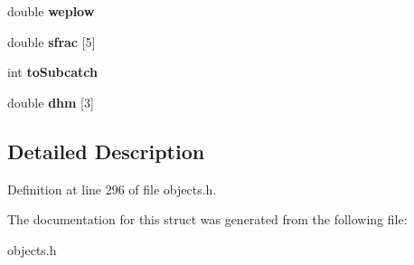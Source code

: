 \begin{DoxyCompactItemize}
double {\bfseries weplow}
\item 
\mbox{\label{struct_t_snowmelt_aede75af251b0ca1ae80c6357b9d7d625}} 
double {\bfseries sfrac} \mbox{[}5\mbox{]}
\item 
\mbox{\label{struct_t_snowmelt_adaef91ae742e7617e5513622b72adcf1}} 
int {\bfseries to\+Subcatch}
\item 
\mbox{\label{struct_t_snowmelt_a1cbafdf4b08193297c0563572c334d6f}} 
double {\bfseries dhm} \mbox{[}3\mbox{]}
\end{DoxyCompactItemize}


\subsection{Detailed Description}


Definition at line 296 of file objects.\+h.



The documentation for this struct was generated from the following file\+:\begin{DoxyCompactItemize}
\item 
objects.\+h\end{DoxyCompactItemize}
